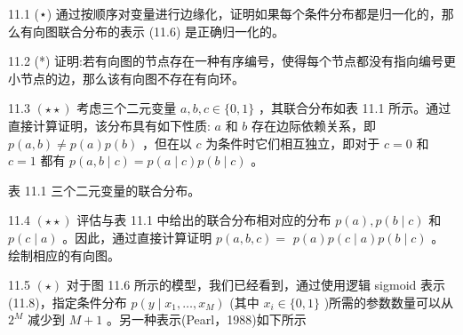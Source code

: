 \documentclass[10pt]{article}
\begin{document}
11.1 (⋆) 通过按顺序对变量进行边缘化，证明如果每个条件分布都是归一化的，那么有向图联合分布的表示 (11.6) 是正确归一化的。

11.2 (*) 证明:若有向图的节点存在一种有序编号，使得每个节点都没有指向编号更小节点的边，那么该有向图不存在有向环。

11.3 \(\left( {\star  \star  }\right)\) 考虑三个二元变量 \(a,b,c \in  \{ 0,1\}\) ，其联合分布如表 11.1 所示。通过直接计算证明，该分布具有如下性质: \(a\) 和 \(b\) 存在边际依赖关系，即 \(p\left( {a,b}\right)  \neq  p\left( a\right) p\left( b\right)\) ，但在以 \(c\) 为条件时它们相互独立，即对于 \(c = 0\) 和 \(c = 1\) 都有 \(p\left( {a,b \mid  c}\right)  = p\left( {a \mid  c}\right) p\left( {b \mid  c}\right)\) 。

表 11.1 三个二元变量的联合分布。

\begin{center}
\end{center}

11.4 \(\left( {\star  \star  }\right)\) 评估与表 11.1 中给出的联合分布相对应的分布 \(p\left( a\right) ,p\left( {b \mid  c}\right)\) 和 \(p\left( {c \mid  a}\right)\) 。因此，通过直接计算证明 \(p\left( {a,b,c}\right)  =\)  \(p\left( a\right) p\left( {c \mid  a}\right) p\left( {b \mid  c}\right)\) 。绘制相应的有向图。

11.5 \(\left( \star \right)\) 对于图 11.6 所示的模型，我们已经看到，通过使用逻辑 sigmoid 表示(11.8)，指定条件分布 \(p\left( {y \mid  {x}_{1},\ldots ,{x}_{M}}\right)\) (其中 \({x}_{i} \in  \{ 0,1\}\) )所需的参数数量可以从 \({2}^{M}\) 减少到 \(M + 1\) 。另一种表示(Pearl，1988)如下所示
\end{document}
